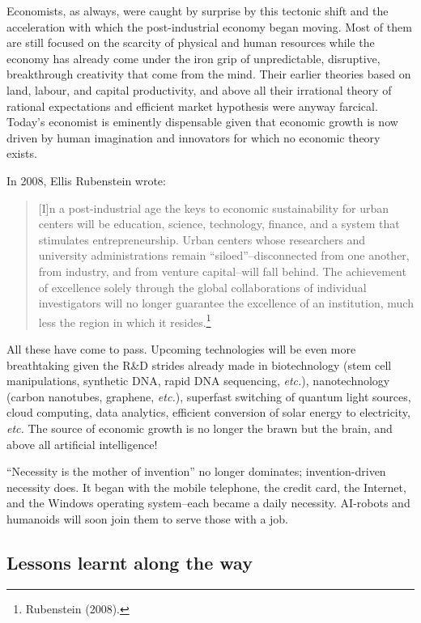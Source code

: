 \begin{multicols}{2}
Economists, as always, were caught by surprise by this tectonic shift and the acceleration with which the post-industrial economy began moving. Most of them are still focused on the scarcity of physical and human resources while the economy has already come under the iron grip of unpredictable, disruptive, breakthrough creativity that come from the mind. Their earlier theories based on land, labour, and capital productivity, and above all their irrational theory of rational expectations and efficient market hypothesis were anyway farcical. Today's economist is eminently dispensable given that economic growth is now driven by human imagination and innovators for which no economic theory exists.

In 2008, Ellis Rubenstein wrote:

\begin{quote}
[I]n a post-industrial age the keys to economic sustainability for urban centers will be education, science, technology, finance, and a system that stimulates entrepreneurship. Urban centers whose researchers and university administrations remain “siloed”--disconnected from one another, from industry, and from venture capital--will fall behind. The achievement of excellence solely through the global collaborations of individual investigators will no longer guarantee the excellence of an institution, much less the region in which it resides.\footnote{Rubenstein (2008).}
\end{quote}

All these have come to pass. Upcoming technologies will be even more breathtaking given the R\&D strides already made in biotechnology (stem cell manipulations, synthetic DNA, rapid DNA sequencing, \textit{etc.}), nanotechnology (carbon nanotubes, graphene, \textit{etc.}), superfast switching of quantum light sources, cloud computing, data analytics, efficient conversion of solar energy to electricity, \textit{etc.} The source of economic growth is no longer the brawn but the brain, and above all artificial intelligence! 

“Necessity is the mother of invention” no longer dominates; invention-driven necessity does. It began with the mobile telephone, the credit card, the Internet, and the Windows operating system--each became a daily necessity. AI-robots and humanoids will soon join them to serve those with a job. 

\subsection*{Lessons learnt along the way}


\end{multicols}
